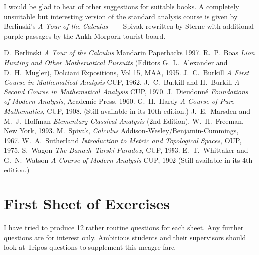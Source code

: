 I would be glad to hear of other suggestions for suitable books.
A completely unsuitable but interesting version of the
standard analysis course is given by Berlinski's
\emph{A Tour of the Calculus}~\cite{Berlinski}
--- Spivak rewritten by Sterne with additional purple
passages by the Ankh-Morpork tourist board.
\begin{thebibliography}{10}
 D.~Berlinski
\emph{A Tour of the Calculus}
Mandarin Paperbacks 1997.
 R.~P.~Boas 
\emph{Lion Hunting and Other Mathematical Pursuits}
(Editors G.~L.~Alexander and D.~H.~Mugler),
Dolciani Expositions, Vol 15, MAA, 1995.
 J.~C.~Burkill
\emph{A First Course in Mathematical Analysis}
CUP, 1962.
 J.~C.~Burkill and H.~Burkill
\emph{A Second Course in Mathematical Analysis}
CUP, 1970.
 J.~Dieudonn\'{e}
\emph{Foundations of Modern Analysis},
Academic Press, 1960.
 G.~H.~Hardy
\emph{A Course of Pure Mathematics}, CUP, 1908. 
(Still available in its 10th edition.)
 J.~E.~Marsden and M.~J.~Hoffman
\emph{Elementary Classical Analysis} (2nd Edition),
W.~H.~Freeman,
New York, 1993.
 M.~Spivak,
\emph{Calculus}
Addison-Wesley/Benjamin-Cummings, 1967.
 W.~A.~Sutherland
\emph{Introduction to Metric and Topological Spaces},
OUP, 1975.
S.~Wagon \emph{The Banach--Tarski Paradox},
CUP, 1993.
 E.~T.~Whittaker and G.~N.~Watson
\emph{A Course of Modern Analysis} CUP, 1902
(Still available in its 4th edition.)
\end{thebibliography}
\newpage
\section{First Sheet of Exercises} 
I have tried to 
produce 12 rather routine questions for each sheet.
Any further questions are for interest
only. Ambitious
students and their supervisors should look at Tripos 
questions to supplement this meagre fare.
\vspace{1\baselineskip}
                                        
